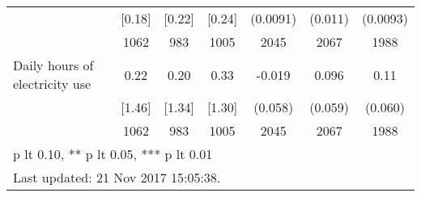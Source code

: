\begin{table}[htbp]
\begin{tabular*}{1\hsize}{@{\hskip\tabcolsep\extracolsep\fill}l*{1}{cccccc}}
                                &   [0.18]&   [0.22]&   [0.24]& (0.0091)         &  (0.011)         & (0.0093)         \\
                                &     1062&      983&     1005&     2045         &     2067         &     1988         \\
Daily hours of electricity use  &     0.22&     0.20&     0.33&   -0.019         &    0.096         &     0.11\sym{*}  \\
                                &   [1.46]&   [1.34]&   [1.30]&  (0.058)         &  (0.059)         &  (0.060)         \\
                                &     1062&      983&     1005&     2045         &     2067         &     1988         \\
\bottomrule
\multicolumn{7}{l}{\footnotesize * p lt 0.10, ** p lt 0.05, *** p lt 0.01}\\
\multicolumn{7}{l}{\footnotesize Last updated: 21 Nov 2017 15:05:38.}\\
\end{tabular*}
\end{table}
